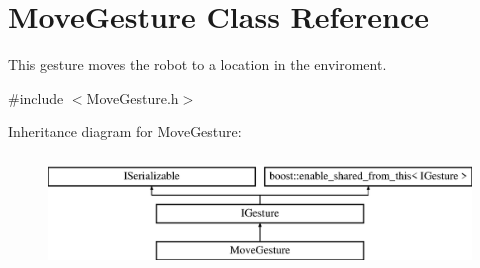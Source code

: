 \hypertarget{class_move_gesture}{}\section{Move\+Gesture Class Reference}
\label{class_move_gesture}


This gesture moves the robot to a location in the enviroment.  




{\ttfamily \#include $<$Move\+Gesture.\+h$>$}

Inheritance diagram for Move\+Gesture\+:\begin{figure}[H]
\begin{center}
\leavevmode
\includegraphics[height=3.000000cm]{class_move_gesture}
\end{center}
\end{figure}
